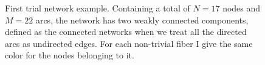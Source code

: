 \documentclass[12pt]{diazessay} %
\begin{document}
\begin{figure}[h]
	\centering
	\qquad
	\caption{First trial network example. Containing a total of $N = 17$ nodes and $M = 22$ arcs, the network has two weakly connected components, defined as the connected networks when we treat all the directed arcs as undirected edges. For each non-trivial fiber I give the same color for the nodes belonging to it.}
	\label{fig:result1}
\end{figure}
\end{document}
